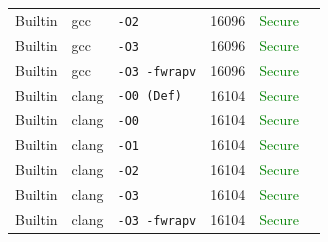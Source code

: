 \begin{table}[htbp]
\begin{tabular}{@{}lllcrl@{}}
Builtin & gcc & \texttt{-O2} & 16096 & \textcolor{green}{Secure}} \\
Builtin & gcc & \texttt{-O3} & 16096 & \textcolor{green}{Secure}} \\
Builtin & gcc & \texttt{-O3 -fwrapv} & 16096 & \textcolor{green}{Secure}} \\
Builtin & clang & \texttt{-O0 (Def)} & 16104 & \textcolor{green}{Secure}} \\
Builtin & clang & \texttt{-O0} & 16104 & \textcolor{green}{Secure}} \\
Builtin & clang & \texttt{-O1} & 16104 & \textcolor{green}{Secure}} \\
Builtin & clang & \texttt{-O2} & 16104 & \textcolor{green}{Secure}} \\
Builtin & clang & \texttt{-O3} & 16104 & \textcolor{green}{Secure}} \\
Builtin & clang & \texttt{-O3 -fwrapv} & 16104 & \textcolor{green}{Secure}} \\
\midrule
\bottomrule \end{tabular} \end{table}

